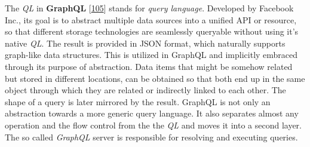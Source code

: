 \documentclass[12pt,english,a4paper,titlepage,cleardoublepage=empty,dottedtoc]{report}
\begin{document}
The \emph{QL} in \textbf{\protect\hypertarget{def--graphql}{}{GraphQL}}
{[}\protect\hyperlink{ref-web_spec_graphql}{105}{]} stands for
\emph{query language}. Developed by Facebook Inc., its goal is to
abstract multiple data sources into a unified API or resource, so that
different storage technologies are seamlessly queryable without using
it's native \emph{QL}. The result is provided in JSON format, which
naturally supports graph-like data structures. This is utilized in
GraphQL and implicitly embraced through its purpose of abstraction. Data
items that might be somehow related but stored in different locations,
can be obtained so that both end up in the same object through which
they are related or indirectly linked to each other. The shape of a
query is later mirrored by the result. GraphQL is not only an
abstraction towards a more generic query language. It also separates
almost any operation and the flow control from the the \emph{QL} and
moves it into a second layer. The so called \emph{GraphQL} server is
responsible for resolving and executing queries.
\end{document}
